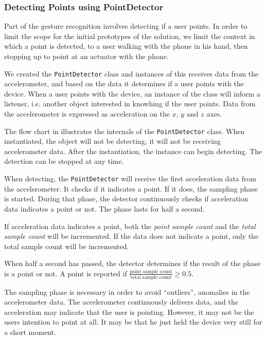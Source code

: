 \subsubsection{Detecting Points using PointDetector}

Part of the gesture recognition involves detecting if a user points. 
In order to limit the scope for the initial prototypes of the solution, 
we limit the context in which a point is detected, 
to a user walking with the phone in his hand, 
then stopping up to point at an actuator with the phone.

We created the \texttt{PointDetector} class and instances of this receives data from the accelerometer, 
and based on the data it determines if a user points with the device. 
When a user points with the device, 
an instance of the class will inform a listener, i.e. another object interested in knowhing if the user points.
Data from the accelerometer is expressed as acceleration on the $x$, $y$ and $z$ axes.

The flow chart in  illustrates the internals of the \texttt{PointDetector} class. 
When instantiated, the object will not be detecting, 
\ie it will not be receiving accelerometer data. 
After the instantiation, the instance can begin detecting. 
The detection can be stopped at any time.

When detecting, the \texttt{PointDetector} will receive the first acceleration data from the accelerometer. It checks if it indicates a point. If it does, the sampling phase is started.
During that phase, the detector continuously checks if acceleration data indicates a point or not. The phase lasts for half a second.

If acceleration data indicates a point, 
both the \emph{point sample count} and the \emph{total sample count} will be incremented. 
If the data does not indicate a point, 
only the total sample count will be incremented.

When half a second has passed, the detector determines if the result of the phase is a point or not. A point is reported if $\frac{\text{point sample count}}{\text{total sample count}} \geq 0.5$.

The sampling phase is necessary in order to avoid ``outliers'', 
\ie anomalies in the accelerometer data. 
The accelerometer continuously delivers data, 
and the acceleration may indicate that the user is pointing. 
However, it may not be the users intention to point at all. 
It may be that he just held the device very still for a short moment.

